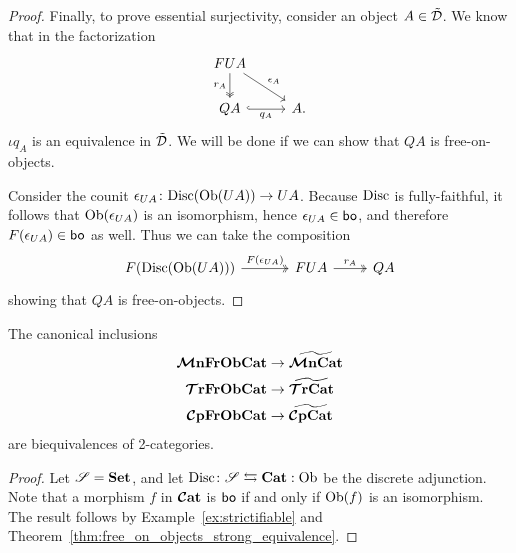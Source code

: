 \documentclass[11pt,oneside,article]{memoir}
\begin{document}
\begin{proof}
   Finally, to prove essential surjectivity, consider an object $A\in\tilde{\mathcal{D}}$. We know that in the
   factorization
   \begin{equation*}
      \begin{tikzcd}
         FUA \ar[dr,"\epsilon_A"] \ar[d,two heads,"r_A"'] & \\
         QA \ar[r,hook,"q_A"'] & A.
      \end{tikzcd}
   \end{equation*}
   $\iota q_A$ is an equivalence in $\tilde{\mathcal{D}}$. We will be done if we can show that $QA$ is
   free-on-objects.

   Consider the counit $\epsilon_{UA}\colon\mathrm{Disc}(\mathrm{Ob}(UA))\to UA$. Because $\mathrm{Disc}$ is fully-faithful,
   it follows that $\mathrm{Ob}(\epsilon_{UA})$ is an isomorphism, hence $\epsilon_{UA}\in\mathsf{bo}$, and
   therefore $F(\epsilon_{UA})\in\mathsf{bo}$ as well. Thus we can take the composition
   \begin{equation*}
      \begin{tikzcd}
         F(\Disc(\Ob(UA))) \ar[r,two heads,"F(\epsilon_{UA})"]
            &[1em] FUA \ar[r,two heads,"r_A"]
            & QA
      \end{tikzcd}
   \end{equation*}
   showing that $QA$ is free-on-objects.
\end{proof}

\begin{corollary}\label{cor:object_frees}
   The canonical inclusions
   \begin{align*}
      \bm{\mathcal{M}}\mathbf{nFrObCat} &\to \widetilde{\bm{\mathcal{M}}\mathbf{nCat}} \\
      \bm{\mathcal{T}}\mathbf{rFrObCat} &\to \widetilde{\bm{\mathcal{T}}\mathbf{rCat}} \\
      \bm{\mathcal{C}}\mathbf{pFrObCat} &\to \widetilde{\bm{\mathcal{C}}\mathbf{pCat}}
   \end{align*}
   are biequivalences of 2-categories.
\end{corollary}

\begin{proof}

Let $\mathscr{S}=\mathbf{Set}$, and let $\mathrm{Disc}\colon\mathscr{S}\leftrightarrows\mathbf{Cat}:\mathrm{Ob}$ be the discrete adjunction. Note that a morphism $f$ in $\bm{\mathcal{C}}\mathbf{at}$ is $\mathsf{bo}$ if and only if $\mathrm{Ob}(f)$ is an isomorphism. The result follows by Example~\ref{ex:strictifiable} and Theorem~\ref{thm:free_on_objects_strong_equivalence}.

\end{proof}
\end{document}
